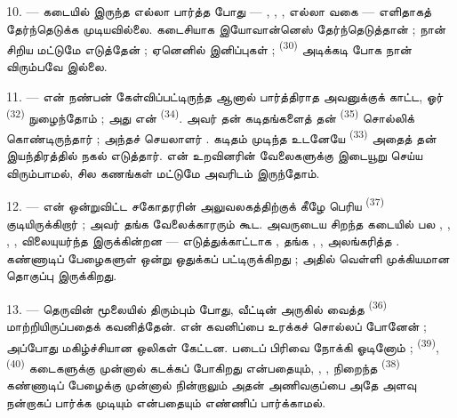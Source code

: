10. --- கடையில் இருந்த எல்லா 
பார்த்த போது — , ,
, எல்லா வகை  — எளிதாகத்
தேர்ந்தெடுக்க முடியவில்லை. கடைசியாக இயோவான்னெஸ்  தேர்ந்தெடுத்தான் ; நான் சிறிய 
மட்டுமே எடுத்தேன் ; ஏனெனில் இனிப்புகள்  ;  \textsuperscript{(30)}
அடிக்கடி போக நான் விரும்பவே இல்லை.

\VUsaut{3.0mm}

11. --- என் நண்பன் கேள்விப்பட்டிருந்த ஆனால் பார்த்திராத
 அவனுக்குக் காட்ட, ஓர்  \textsuperscript{(32)} நுழைந்தோம் ;
அது என்  \textsuperscript{(34)}.
அவர் தன் கடிதங்களைத் தன்
 \textsuperscript{(35)} சொல்லிக்
கொண்டிருந்தார் ; அந்தச் செயலாளர் . கடிதம்
முடிந்த உடனேயே  \textsuperscript{(33)} அதைத் தன்
இயந்திரத்தில் நகல் எடுத்தார். என் உறவினரின் வேலைகளுக்கு இடையூறு
செய்ய விரும்பாமல், சில கணங்கள் மட்டுமே அவரிடம் இருந்தோம்.

12. --- என் ஒன்றுவிட்ட சகோதரரின் அலுவலகத்திற்குக் கீழே பெரிய
 \textsuperscript{(37)}
குடியிருக்கிறார் ; அவர் தங்க வேலைக்காரரும் கூட. அவருடைய சிறந்த
கடையில் பல , ,
, ,
விலையுயர்ந்த  இருக்கின்றன — எடுத்துக்காட்டாக
, தங்க ,
, 
 அலங்கரித்த . கண்ணாடிப்
பேழைகளுள் ஒன்று  ஒதுக்கப்
பட்டிருக்கிறது ; அதில் வெள்ளி 
முக்கியமான தொகுப்பு இருக்கிறது.

13. --- தெருவின் மூலையில் திரும்பும் போது, வீட்டின்
 அருகில் வைத்த 
\textsuperscript{(36)} மாற்றியிருப்பதைக் கவனித்தேன். என் கவனிப்பை
உரக்கச் சொல்லப் போனேன் ; அப்போது 
மகிழ்ச்சியான ஒலிகள் கேட்டன. படைப் பிரிவை நோக்கி ஓடினோம் ;
  \textsuperscript{(39)},
 \textsuperscript{(40)} கடைகளுக்கு முன்னால்
கடக்கப் போகிறது என்பதையும், ,
,  நிறைந்த
 \textsuperscript{(38)} கண்ணாடிப் பேழைக்கு
முன்னால் நின்றாலும் அதன் அணிவகுப்பை அதே அளவு நன்றாகப் பார்க்க
முடியும் என்பதையும் எண்ணிப் பார்க்காமல்.

